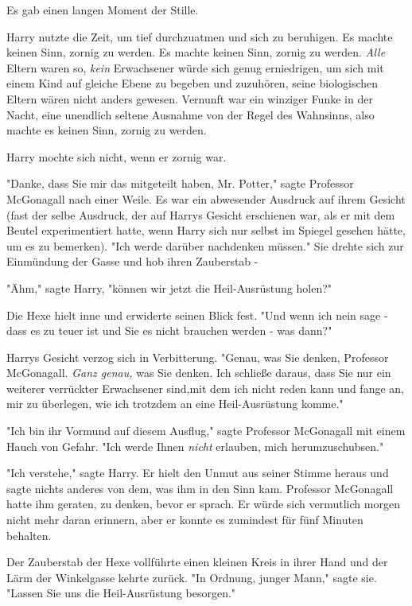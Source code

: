 {Es gab einen langen Moment der Stille.

Harry nutzte die Zeit, um tief durchzuatmen und sich zu beruhigen. Es machte keinen Sinn, zornig zu werden. Es machte keinen Sinn, zornig zu werden. \emph{Alle} Eltern waren so, \emph{kein} Erwachsener würde sich genug erniedrigen, um sich mit einem Kind auf gleiche Ebene zu begeben und zuzuhören, seine biologischen Eltern wären nicht anders gewesen. Vernunft war ein winziger Funke in der Nacht, eine unendlich seltene Ausnahme von der Regel des Wahnsinns, also machte es keinen Sinn, zornig zu werden.

Harry mochte sich nicht, wenn er zornig war.

"Danke, dass Sie mir das mitgeteilt haben, Mr. Potter," sagte Professor McGonagall nach einer Weile. Es war ein abwesender Ausdruck auf ihrem Gesicht (fast der selbe Ausdruck, der auf Harrys Gesicht erschienen war, als er mit dem Beutel experimentiert hatte, wenn Harry sich nur selbst im Spiegel gesehen hätte, um es zu bemerken). "Ich werde darüber nachdenken müssen." Sie drehte sich zur Einmündung der Gasse und hob ihren Zauberstab -

"Ähm," sagte Harry, "können wir jetzt die Heil-Ausrüstung holen?"

Die Hexe hielt inne und erwiderte seinen Blick fest. "Und wenn ich nein sage - dass es zu teuer ist und Sie es nicht brauchen werden - was dann?"

Harrys Gesicht verzog sich in Verbitterung. "Genau, was Sie denken, Professor McGonagall. \emph{Ganz genau,} was Sie denken. Ich schließe daraus, dass Sie nur ein weiterer verrückter Erwachsener sind,mit dem ich nicht reden kann und fange an, mir zu überlegen, wie ich trotzdem an eine Heil-Ausrüstung komme."

"Ich bin ihr Vormund auf diesem Ausflug," sagte Professor McGonagall mit einem Hauch von Gefahr. "Ich werde Ihnen \emph{nicht} erlauben, mich herumzuschubsen."

"Ich verstehe," sagte Harry. Er hielt den Unmut aus seiner Stimme heraus und sagte nichts anderes von dem, was ihm in den Sinn kam. Professor McGonagall hatte ihm geraten, zu denken, bevor er sprach. Er würde sich vermutlich morgen nicht mehr daran erinnern, aber er konnte es zumindest für fünf Minuten behalten.

Der Zauberstab der Hexe vollführte einen kleinen Kreis in ihrer Hand und der Lärm der Winkelgasse kehrte zurück. "In Ordnung, junger Mann," sagte sie. "Lassen Sie uns die Heil-Ausrüstung besorgen."

}
